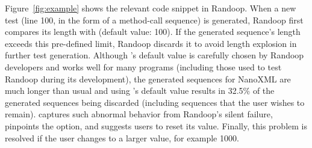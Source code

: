 Figure~\ref{fig:example} shows the relevant code snippet
in Randoop.  When a new test (line 100, in the form of
a method-call sequence) is generated,
Randoop first compares its length with 
(default value: 100). If the
generated sequence's length exceeds this pre-defined limit,
Randoop discards it to avoid length explosion in further
test generation.
Although 's default value is carefully chosen
by Randoop developers
and works well for many programs (including those used to test
Randoop during its development), the generated sequences for NanoXML
are much longer than usual and using 's default value
results in 32.5\% of the generated sequences being discarded
(including sequences that the user wishes to remain).
\ourtool captures such abnormal behavior from Randoop's
silent failure, pinpoints the
 option, and suggests users to reset its value.
Finally, this problem is resolved if
the user changes  to a larger value, for example 1000.





